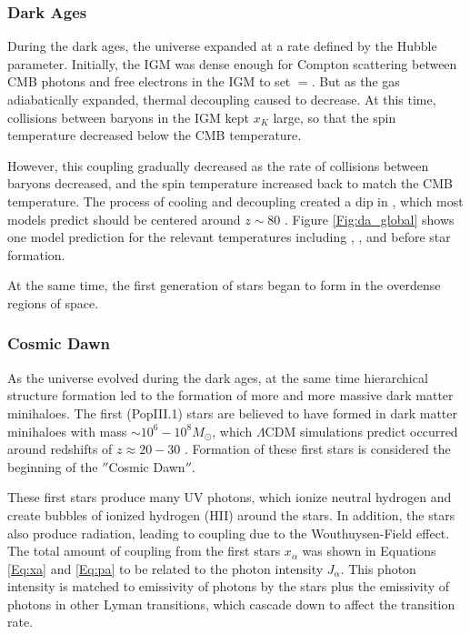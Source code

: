 \subsubsection{Dark Ages}
During the dark ages, the universe expanded at a rate defined by the Hubble parameter. Initially, the IGM was dense enough for Compton scattering between CMB photons and free electrons in the IGM to set \tk$=$\tg. But as the gas adiabatically expanded, thermal decoupling caused \tk to decrease. At this time, collisions between baryons in the IGM kept $x_K$ large, so that the spin temperature decreased below the CMB temperature. 

However, this coupling gradually decreased as the rate of collisions between baryons decreased, and the spin temperature increased back to match the CMB temperature. The process of cooling and decoupling created a dip in \ts, which most models predict should be centered around $z \sim 80 $ \cite{furlanetto_2006}. Figure \ref{Fig:da_global} shows one model prediction for the relevant temperatures including \tg, \tk, \ts and \dtb before star formation. 

At the same time, the first generation of stars began to form in the overdense regions of space. 

\subsubsection{Cosmic Dawn}
As the universe evolved during the dark ages, at the same time hierarchical structure formation led to the formation of more and more massive dark matter minihaloes. The first (PopIII.1) stars are believed to have formed in dark matter minihaloes with mass $\sim 10^6 - 10^8 M_{\odot}$, which $\Lambda$CDM simulations predict occurred around redshifts of $z \approx 20-30$ \cite{bromm_2013}. Formation of these first stars is considered the beginning of the $''$Cosmic Dawn$''$. 


These first stars produce many UV photons, which ionize neutral hydrogen and create bubbles of ionized hydrogen (HII) around the stars. In addition, the stars also produce \lya  radiation, leading to coupling due to the Wouthuysen-Field effect. The total amount of coupling from the first stars $x_\alpha$ was shown in Equations \ref{Eq:xa} and \ref{Eq:pa} to be related to the \lya  photon intensity $J_\alpha$. This photon intensity is matched to emissivity of \lya  photons by the stars  plus the emissivity of photons in other Lyman transitions, which cascade down to affect the \lya  transition rate. 

